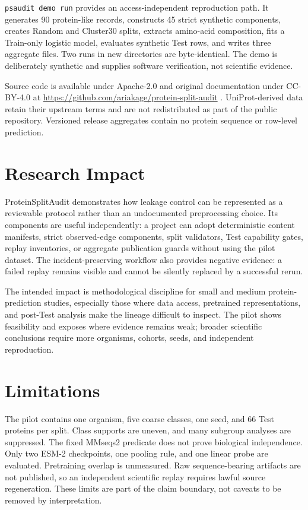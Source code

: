 \documentclass[11pt]{article}
\begin{document}
\texttt{psaudit demo run} provides an access-independent reproduction path. It generates 90
protein-like records, constructs 45 strict synthetic components, creates Random and Cluster30
splits, extracts amino-acid composition, fits a Train-only logistic model, evaluates synthetic
Test rows, and writes three aggregate files. Two runs in new directories are byte-identical. The
demo is deliberately synthetic and supplies software verification, not scientific evidence.

Source code is available under Apache-2.0 and original documentation under CC-BY-4.0 at
\url{https://github.com/ariakage/protein-split-audit} \citep{proteinsplitaudit}. UniProt-derived
data retain their upstream terms and are not redistributed as part of the public repository.
Versioned release aggregates contain no protein sequence or row-level prediction.

\section*{Research Impact}

ProteinSplitAudit demonstrates how leakage control can be represented as a reviewable protocol
rather than an undocumented preprocessing choice. Its components are useful independently: a
project can adopt deterministic content manifests, strict observed-edge components, split
validators, Test capability gates, replay inventories, or aggregate publication guards without
using the pilot dataset. The incident-preserving workflow also provides negative evidence: a
failed replay remains visible and cannot be silently replaced by a successful rerun.

The intended impact is methodological discipline for small and medium protein-prediction studies,
especially those where data access, pretrained representations, and post-Test analysis make the
lineage difficult to inspect. The pilot shows feasibility and exposes where evidence remains
weak; broader scientific conclusions require more organisms, cohorts, seeds, and independent
reproduction.

\section*{Limitations}

The pilot contains one organism, five coarse classes, one seed, and 66 Test proteins per split.
Class supports are uneven, and many subgroup analyses are suppressed. The fixed MMseqs2 predicate
does not prove biological independence. Only two ESM-2 checkpoints, one pooling rule, and one
linear probe are evaluated. Pretraining overlap is unmeasured. Raw sequence-bearing artifacts are
not published, so an independent scientific replay requires lawful source regeneration. These
limits are part of the claim boundary, not caveats to be removed by interpretation.
\end{document}
